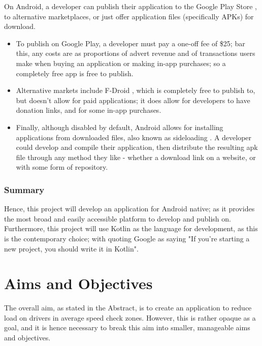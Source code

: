 \documentclass[11pt, a4paper, notitlepage]{report}
\begin{document}
On Android, a developer can publish their application to the Google Play Store \citep{googlePlay}, to alternative marketplaces, or just offer application files (specifically APKs) for download.
\begin{itemize}
	\item To publish on Google Play, a developer must pay a one-off fee of \$25; bar this, any costs are as proportions of advert revenue and of transactions users make when buying an application or making in-app purchases; so a completely free app is free to publish.
	\item Alternative markets include F-Droid \citep{FDroid}, which is completely free to publish to, but doesn't allow for paid applications; it does allow for developers to have donation links, and for some in-app purchases.
	\item Finally, although disabled by default, Android allows for installing applications from downloaded files, also known as sideloading \citep{sideloading}. A developer could develop and compile their application, then distribute the resulting apk file through any method they like - whether a download link on a website, or with some form of repository.
\end{itemize}

\subsection{Summary}
Hence, this project will develop an application for Android native; as it provides the most broad and easily accessible platform to develop and publish on. Furthermore, this project will use Kotlin as the language for development, as this is the contemporary choice; with \citet{KotlinFirst} quoting Google as saying "If you’re starting a new project, you should write it in Kotlin".

\chapter{Aims and Objectives}\label{ch:AnO}
The overall aim, as stated in the Abstract, is to create an application to reduce load on drivers in average speed check zones. However, this is rather opaque as a goal, and it is hence necessary to break this aim into smaller, manageable aims and objectives.
\end{document}
